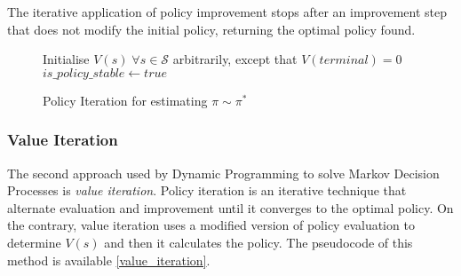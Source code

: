 The iterative application of policy improvement stops after an improvement step that does not modify the initial policy, returning the optimal policy found.
\begin{figure}
	
	\begin{algorithm}[H]
		\SetAlgoLined
		\DontPrintSemicolon
		\LinesNumbered
		Initialise $V(s) \; \forall s \in \mathcal{S}$ arbitrarily, except that $V(terminal) = 0$\;
		$is\_policy\_stable \leftarrow true$\;
		\caption{Policy Iteration for estimating $\pi \sim \pi^*$}
		\label{policy_evaluation}
	\end{algorithm}
\end{figure}

\subsubsection{Value Iteration}

The second approach used by Dynamic Programming to solve Markov Decision Processes is \textit{value iteration}.
Policy iteration is an iterative technique that alternate evaluation and improvement until it converges to the optimal policy.
On the contrary, value iteration uses a modified version of policy evaluation to determine $V(s)$ and then it calculates the policy.
The pseudocode of this method is available \vref{value_iteration}.

